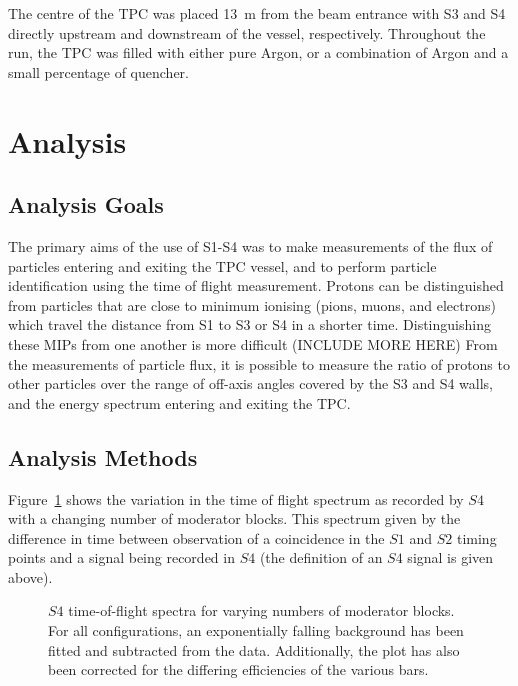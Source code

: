 The centre of the TPC was placed 13~m from the beam entrance with S3 and S4 directly upstream and downstream of the vessel, respectively. Throughout the run, the TPC was filled with either pure Argon, or a combination of Argon and a small percentage of quencher.



\section{Analysis}
\subsection{Analysis Goals}
The primary aims of the use of S1-S4 was to make measurements of the flux of particles entering and exiting the TPC vessel, and to perform particle identification using the time of flight measurement.
Protons can be distinguished from particles that are close to minimum ionising (pions, muons, and electrons) which travel the distance from S1 to S3 or S4 in a shorter time.
Distinguishing these MIPs from one another is more difficult (INCLUDE MORE HERE)
From the measurements of particle flux, it is possible to measure the ratio of protons to other particles over the range of off-axis angles covered by the S3 and S4 walls, and the energy spectrum entering and exiting the TPC.

\subsection{Analysis Methods}

	Figure~\ref{fig:s4tof} shows the variation in the time of flight spectrum as recorded by $S4$ with a changing number of moderator blocks. 
	This spectrum given by the difference in time between observation of a coincidence in the $S1$ and $S2$ timing points and a signal being recorded in $S4$ (the definition of an $S4$ signal is given above).
	
	\begin{figure}[h]
		\begin{adjustbox}{max totalsize={.8\textwidth}{.5\textheight},center}
			
		\end{adjustbox}
		\caption{$S4$ time-of-flight spectra for varying numbers of moderator blocks. For all configurations, an exponentially falling background has been fitted and subtracted from the data. Additionally, the plot has also been corrected for the differing efficiencies of the various bars.}
		\label{fig:s4tof}	
	\end{figure}

